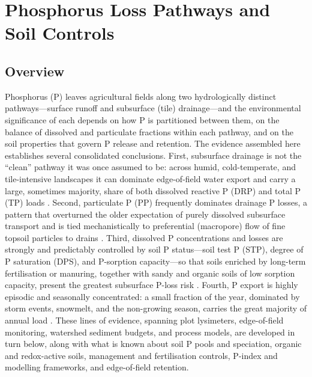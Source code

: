 \documentclass[11pt]{article}
\begin{document}
\section*{Phosphorus Loss Pathways and Soil Controls}

\subsection{Overview}

Phosphorus (P) leaves agricultural fields along two hydrologically distinct
pathways---surface runoff and subsurface (tile) drainage---and the environmental
significance of each depends on how P is partitioned between them, on the balance
of dissolved and particulate fractions within each pathway, and on the soil
properties that govern P release and retention. The evidence assembled here
establishes several consolidated conclusions. First, subsurface drainage is not
the ``clean'' pathway it was once assumed to be: across humid, cold-temperate,
and tile-intensive landscapes it can dominate edge-of-field water export and
carry a large, sometimes majority, share of both dissolved reactive P (DRP) and
total P (TP) loads \parencite{Pease2018,VanEsbroeck2016,Qi2018,Sadhukhan2019b}.
Second, particulate P (PP) frequently dominates drainage P losses, a pattern that
overturned the older expectation of purely dissolved subsurface transport and is
tied mechanistically to preferential (macropore) flow of fine topsoil particles
to drains \parencite{Uusitalo2001,Lu2003,Laubel1999,Sims1998}. Third, dissolved P
concentrations and losses are strongly and predictably controlled by soil P
status---soil test P (STP), degree of P saturation (DPS), and P-sorption
capacity---so that soils enriched by long-term fertilisation or manuring, together
with sandy and organic soils of low sorption capacity, present the greatest
subsurface P-loss risk \parencite{Sharpley1995,Beauchemin2003,Siemens2004,Sims1998,McDowell2001b}.
Fourth, P export is highly episodic and seasonally concentrated: a small fraction
of the year, dominated by storm events, snowmelt, and the non-growing season,
carries the great majority of annual load
\parencite{King2015,VanEsbroeck2016,Brendel2019,Grant1996}. These lines of
evidence, spanning plot lysimeters, edge-of-field monitoring, watershed sediment
budgets, and process models, are developed in turn below, along with what is known
about soil P pools and speciation, organic and redox-active soils, management and
fertilisation controls, P-index and modelling frameworks, and edge-of-field
retention.
\end{document}
